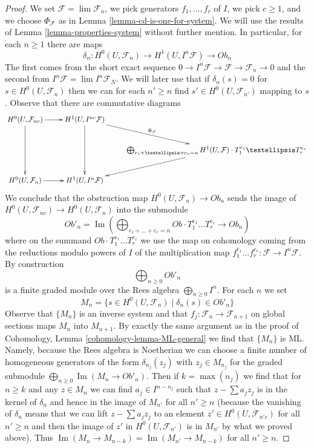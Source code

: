 \documentclass{stacks-project}
\theoremstyle{plain}
\theoremstyle{definition}
\theoremstyle{remark}
\numberwithin{equation}{subsection}
\def\lim{\mathop{\mathrm{lim}}\nolimits}
\def\Im{\mathop{\mathrm{Im}}}
\begin{document}
\begin{proof}
\medskip\noindent
We set $\mathcal{F} = \lim \mathcal{F}_n$, we pick generators
$f_1, \ldots, f_r$ of $I$, we pick $c \geq 1$, and we choose
$\Phi_\mathcal{F}$ as in Lemma \ref{lemma-cd-is-one-for-system}.
We will use the results of Lemma \ref{lemma-properties-system}
without further mention. In particular, for each $n \geq 1$ there are maps
$$
\delta_n :
H^0(U, \mathcal{F}_n)
\longrightarrow
H^1(U, I^n\mathcal{F})
\longrightarrow
Ob_n
$$
The first comes from the short exact sequence
$0 \to I^n\mathcal{F} \to \mathcal{F} \to \mathcal{F}_n \to 0$
and the second from $I^n\mathcal{F} = \lim I^n\mathcal{F}_N$.
We will later use that if $\delta_n(s) = 0$ for $s \in H^0(U, \mathcal{F}_n)$
then we can for each $n' \geq n$ find $s' \in H^0(U, \mathcal{F}_{n'})$
mapping to $s$.
Observe that there are commutative diagrams
$$
\xymatrix{
H^0(U, \mathcal{F}_{nc}) \ar[r] \ar[dd] &
H^1(U, I^{nc}\mathcal{F}) \ar[dd] \ar[rd]^{\Phi_\mathcal{F}} \\
& &
\bigoplus_{e_1 + \ldots + e_r = n}
H^1(U, \mathcal{F}) \cdot T_1^{e_1} \ldots T_r^{e_r} \ar[ld] \\
H^0(U, \mathcal{F}_n) \ar[r] &
H^1(U, I^n\mathcal{F})
}
$$
We conclude that the obstruction map
$H^0(U, \mathcal{F}_n) \to Ob_n$
sends the image of
$H^0(U, \mathcal{F}_{nc}) \to H^0(U, \mathcal{F}_n)$
into the submodule
$$
Ob'_n =
\Im\left(
\bigoplus\nolimits_{e_1 + \ldots + e_r = n}
Ob \cdot T_1^{e_1} \ldots T_r^{e_r} \to Ob_n
\right)
$$
where on the summand $Ob \cdot T_1^{e_1} \ldots T_r^{e_r}$
we use the map on cohomology coming from the reductions modulo
powers of $I$ of the multiplication map
$f_1^{e_1} \ldots f_r^{e_r} : \mathcal{F} \to I^n\mathcal{F}$.
By construction
$$
\bigoplus\nolimits_{n \geq 0} Ob'_n
$$
is a finite graded module over the Rees algebra $\bigoplus_{n \geq 0} I^n$.
For each $n$ we set
$$
M_n = \{s \in H^0(U, \mathcal{F}_n) \mid \delta_n(s) \in Ob'_n\}
$$
Observe that $\{M_n\}$ is an inverse system and that
$f_j : \mathcal{F}_n \to \mathcal{F}_{n + 1}$ on global
sections maps $M_n$ into $M_{n + 1}$.
By exactly the same argument as in the proof of
Cohomology, Lemma \ref{cohomology-lemma-ML-general}
we find that $\{M_n\}$ is ML. Namely, because the Rees algebra
is Noetherian we can choose a finite number of homogeneous generators
of the form $\delta_{n_j}(z_j)$ with $z_j \in M_{n_j}$ for the graded submodule
$\bigoplus_{n \geq 0} \Im(M_n \to Ob'_n)$.
Then if $k = \max(n_j)$ we find that for $n \geq k$
and any $z \in M_n$ we can find $a_j \in I^{n - n_j}$ such that
$z - \sum a_j z_j$ is in the kernel of $\delta_n$
and hence in the image of $M_{n'}$ for all $n' \geq n$
(because the vanishing of $\delta_n$ means that we can
lift $z - \sum a_j z_j$ to an element $z' \in H^0(U, \mathcal{F}_{n'c})$
for all $n' \ge n$ and then the image of $z'$ in $H^0(U, \mathcal{F}_{n'})$
is in $M_{n'}$ by what we proved above).
Thus $\Im(M_n \to M_{n - k}) = \Im(M_{n'} \to M_{n - k})$
for all $n' \geq n$.


\end{proof}
\end{document}
